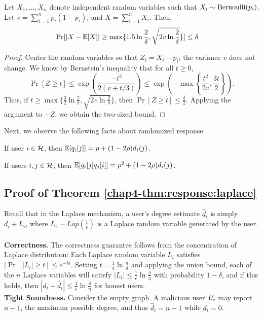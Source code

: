 \begin{lemma}\label{chap4-lem:bern-concentration}
    Let $X_1, \ldots, X_n$ denote independent random variables such that $X_i \sim \textnormal{Bernoulli}(p_i)$. Let $v = \sum_{i=1}^n p_i(1-p_i)$, and $X = \sum_{i=1}^n X_i$. Then,
    \begin{align*}
        \Pr[|X - \operatorname{\mathbb{E}}[X]| \geq \max\{1.5 \ln \frac{2}{\delta}, \sqrt{2v\ln \frac{2}{\delta}}\}] &\leq \delta.
    \end{align*}
\end{lemma}
\begin{proof}
    Center the random variables so that $Z_i = X_i - p_i$; the variance $v$ does not change. We know by Bernstein's inequality that for all $t \geq 0$,
    \[
        \Pr[Z \geq t] \leq \exp\left(\frac{-t^2}{2(v + t / 3)}\right) \leq \exp\left(- \max \left\{ \frac{t^2}{2v}, \frac{3t}{2}\right\}\right).
    \]
    Thus, if $t \geq \max\{\frac{3}{2} \ln \frac{2}{\delta}, \sqrt{2 v \ln \frac{2}{\delta}}\}$, then $\Pr[Z \geq t] \leq \frac{\delta}{2}$. Applying the argument to $-Z$, we obtain the two-sized bound.
    
\end{proof}

Next, we observe the following facts about randomized response.
\begin{fact}\label{chap4-fact:rr-exp}
If user $i \in \mathcal{H}$, then $\operatorname{\mathbb{E}}[q_i[j]] = \rho + (1-2\rho) d_i(j)$.
\end{fact}

\begin{fact}\label{chap4-fact:2rr-exp}
If users $i,j \in \mathcal{H}$, then $\operatorname{\mathbb{E}}[q_i[j]q_j[i]] = \rho^2 + (1-2\rho) d_i(j)$.
\end{fact}
\subsection{Proof of Theorem \ref{chap4-thm:response:laplace}}\label{chap4-app:thm:response:laplace}
Recall that in the Laplace mechanism, a user's degree estimate $\hat{d}_i$ is simply $d_i + L_i$, where $L_i \sim Lap(\frac{1}{\epsilon})$ is a Laplace random variable generated by the user.\\\\\noindent
\textbf{Correctness.} The correctness guarantee follows from the concentration of Laplace distribution: Each Laplace random variable $L_i$ satisfies $|\Pr[|L_i| \geq t] \leq e^{-t\epsilon}$. Setting $t = \frac{1}{\epsilon}\ln \frac{n}{\delta}$ and applying the union bound, each of the $n$ Laplace variables will satisfy $|L_i| \leq \frac{1}{\epsilon}\ln \frac{\delta}{n}$ with probability $1-\delta$, and if this holds, then $|d_i - \hat{d}_i| \leq \frac{1}{\epsilon}\ln \frac{\delta}{n}$ for honest users.
\\
\noindent\textbf{Tight Soundness.} Consider the empty graph. A malicious user $\textit{U}_i$ may report $n-1$, the maximum possible degree, and thus $\hat{d}_i = n-1$ while $d_i = 0$.

